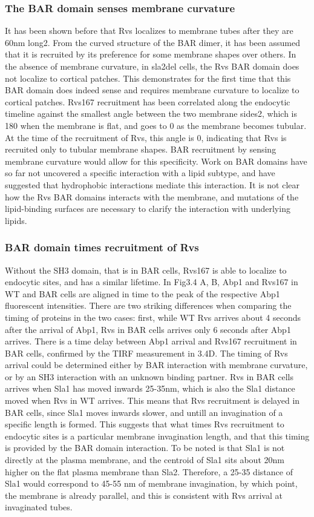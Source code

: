 \subsubsection{The BAR domain senses membrane curvature}
It has been shown before that Rvs localizes to membrane tubes after they are 60nm long2. From the curved structure of the BAR dimer, it has been assumed that it is recruited by its preference for some membrane shapes over others. In the absence of membrane curvature, in sla2del cells, the Rvs BAR domain does not localize to cortical patches. This demonstrates for the first time that this BAR domain does indeed sense and requires membrane curvature to localize to cortical patches. Rvs167 recruitment has been correlated along the endocytic timeline against the smallest angle between the two membrane sides2, which is 180 when the membrane is flat, and goes to 0 as the membrane becomes tubular. At the time of the recruitment of Rvs, this angle is 0, indicating that Rvs is recruited only to tubular membrane shapes. BAR recruitment by sensing membrane curvature would allow for this specificity. Work on BAR domains have so far not uncovered a specific interaction with a lipid subtype, and have suggested that hydrophobic interactions mediate this interaction. It is not clear how the Rvs BAR domains interacts with the membrane, and mutations of the lipid-binding surfaces are necessary to clarify the interaction with underlying lipids.

\subsubsection{BAR domain times recruitment of Rvs} 

Without the SH3 domain, that is in BAR cells, Rvs167 is able to localize to endocytic sites, and has a similar lifetime. In Fig3.4 A, B, Abp1 and Rvs167 in WT and BAR cells are aligned in time to the peak of the respective Abp1 fluorescent intensities. There are two striking differences when comparing the timing of proteins in the two cases: first, while WT Rvs arrives about 4 seconds after the arrival of Abp1, Rvs in BAR cells arrives only 6 seconds after Abp1 arrives. There is a time delay between Abp1 arrival and Rvs167 recruitment in BAR cells, confirmed by the TIRF measurement in 3.4D. 
The timing of Rvs arrival could be determined either by BAR interaction with membrane curvature, or by an SH3 interaction with an unknown binding partner. Rvs in BAR cells arrives when Sla1 has moved inwards 25-35nm, which is also the Sla1 distance moved when Rvs in WT arrives. This means that Rvs recruitment is delayed in BAR cells, since Sla1 moves inwards slower, and untill an invagination of a specific length is formed. This suggests that what times Rvs recruitment to endocytic sites is a particular membrane invagination length, and that this timing is provided by the BAR domain interaction. To be noted is that Sla1 is not directly at the plasma membrane, and the centroid of Sla1 sits about 20nm higher on the flat plasma membrane than Sla2. Therefore, a 25-35 distance of Sla1 would correspond to 45-55 nm of membrane invagination, by which point, the membrane is already parallel, and this is consistent with Rvs arrival at invaginated tubes. 

